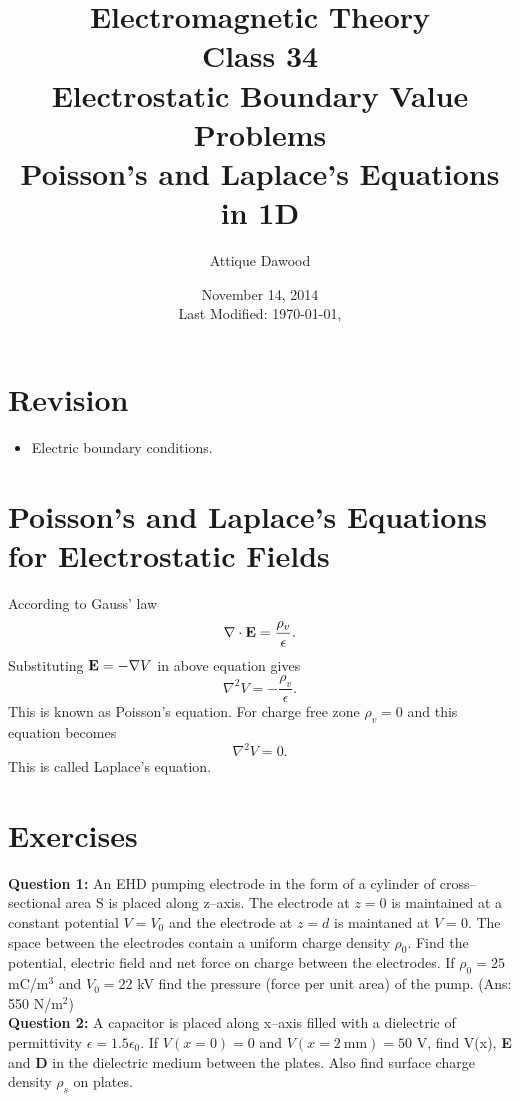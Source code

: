 \documentclass[12pt,a4paper]{article}
\title{Electromagnetic Theory\\Class 34\\Electrostatic Boundary Value Problems\\Poisson's and Laplace's Equations in 1D}
\author{Attique Dawood}
\date{November 14, 2014\\[0.2cm] Last Modified: \today, \currenttime}
\begin{document}
\maketitle
\section{Revision}
\begin{itemize}
\item Electric boundary conditions.
\end{itemize}
\section{Poisson's and Laplace's Equations for Electrostatic Fields}
According to Gauss' law
\begin{equation}
\nabla\cdot\mathrm{\textbf E}=\dfrac{\rho_v}{\epsilon}.
\end{equation}
Substituting $\mathrm{\textbf E}=-\nabla V$ in above equation gives
\begin{equation}
\nabla^2V=-\dfrac{\rho_v}{\epsilon}.
\end{equation}
This is known as Poisson's equation. For charge free zone $\rho_v=0$ and this equation becomes
\begin{equation}
\nabla^2V=0.
\end{equation}
This is called Laplace's equation.
\section{Exercises}
\noindent\textbf{Question 1:} An EHD pumping electrode in the form of a cylinder of cross--sectional area S is placed along z--axis. The electrode at $z=0$ is maintained at a constant potential $V=V_0$ and the electrode at $z=d$ is maintaned at $V=0$. The space between the electrodes contain a uniform charge density $\rho_0$. Find the potential, electric field and net force on charge between the electrodes. If $\rho_0=25$ mC/m$^3$ and $V_0=22$ kV find the pressure (force per unit area) of the pump. (Ans: 550 N/m$^2$)\\[0.2cm]
\noindent\textbf{Question 2:} A capacitor is placed along x--axis filled with a dielectric of permittivity $\epsilon=1.5\epsilon_0$. If $V(x=0)=0$ and $V(x=2\mathrm{~mm})=50$ V, find V(x), \textbf{E} and \textbf{D} in the dielectric medium between the plates. Also find surface charge density $\rho_s$ on plates.
%
%
\end{document}
